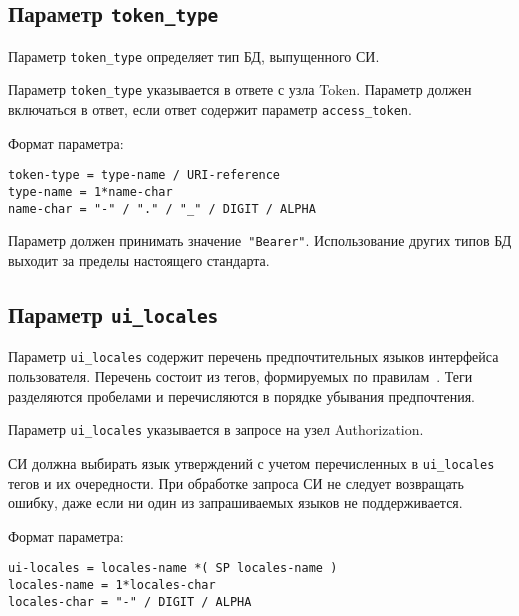 \subsection{Параметр \lstinline{token_type}}\label{PARAMS.TokenType} 

Параметр \lstinline{token_type} определяет тип БД, выпущенного СИ.

Параметр \lstinline{token_type} указывается в ответе с узла Token.
%
Параметр должен включаться в ответ, если ответ содержит параметр 
\lstinline{access_token}. 

Формат параметра:
\begin{lstlisting}
token-type = type-name / URI-reference
type-name = 1*name-char
name-char = "-" / "." / "_" / DIGIT / ALPHA
\end{lstlisting}

Параметр должен принимать значение~\lstinline{"Bearer"}. 
%
Использование других типов БД выходит за пределы настоящего стандарта. 

\subsection{Параметр \lstinline{ui_locales}}\label{PARAMS.UiLocales}

Параметр \lstinline{ui_locales} содержит перечень предпочтительных 
языков интерфейса пользователя.
%
Перечень состоит из тегов, формируемых по правилам~\cite{RFC5646}. 
%
Теги разделяются пробелами и перечисляются в порядке убывания предпочтения.

Параметр \lstinline{ui_locales} указывается в запросе на узел Authorization.

СИ должна выбирать язык утверждений с учетом перечисленных в 
\lstinline{ui_locales} тегов и их очередности. 
%
При обработке запроса СИ не следует возвращать ошибку, даже если ни один из 
запрашиваемых языков не поддерживается.

Формат параметра:
\begin{lstlisting}
ui-locales = locales-name *( SP locales-name )
locales-name = 1*locales-char
locales-char = "-" / DIGIT / ALPHA
\end{lstlisting}

